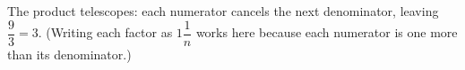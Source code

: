 The product telescopes: each numerator cancels the next denominator, leaving $\dfrac{9}{3}=\boxed{3}$. (Writing each factor as $1\dfrac{1}{n}$ works here because each numerator is one more than its denominator.)
